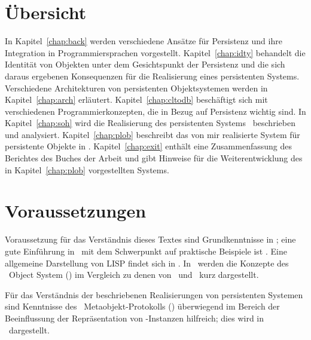 \section{\"{U}bersicht}
%
In Kapitel~\ref{chap:back} werden verschiedene Ans\"{a}tze f\"{u}r
Persistenz und ihre Integration in Programmiersprachen vorgestellt.
Kapitel~\ref{chap:idty} behandelt die Identit\"{a}t von Objekten unter
dem Gesichtspunkt der Persistenz und die sich daraus ergebenen
Konsequenzen f\"{u}r die Realisierung eines persistenten Systems.
Verschiedene Architekturen von persistenten Objektsystemen werden in
Kapitel~\ref{chap:arch} erl\"{a}utert.  Kapitel~\ref{chap:cltodb}
besch\"{a}ftigt sich mit verschiedenen Programmierkonzepten, die in
Bezug auf Persistenz wichtig sind.  \ifbericht\else In
Kapitel~\ref{chap:soh} wird die Realisierung des persistenten Systems
\soh\ beschrieben und analysiert. \fi Kapitel~\ref{chap:plob}
beschreibt das von mir realisierte System f\"{u}r persistente Objekte
in \cl. Kapitel~\ref{chap:exit} enth\"{a}lt eine Zusammenfassung
\ifbericht des Berichtes \else\ifbuch des Buches \else der Arbeit
\fi\fi und gibt Hinweise f\"{u}r die Weiterentwicklung des in
Kapitel~\ref{chap:plob} vorgestellten Systems.
%
\section{Voraussetzungen}
%
Voraussetzung f\"{u}r das Verst\"{a}ndnis dieses Textes sind Grundkenntnisse
in \cl; eine gute Einf\"{u}hrung in \cl\ mit dem Schwerpunkt auf
praktische Beispiele ist \cite{bib:no92}. Eine allgemeine Darstellung
von LISP findet sich in \cite{bib:wi89}. In
\ werden die Konzepte des \cl\ Object System
(\clos) im Vergleich zu denen von \smalltalk\ und \cpp\ kurz
dargestellt.
%
\par{}F\"{u}r das Verst\"{a}ndnis der beschriebenen Realisierungen von
persistenten Systemen sind Kenntnisse des \clos\ Metaobjekt-Protokolls
(\mop) \"{u}berwiegend im Bereich der Beeinflussung der
Repr\"{a}sentation von \clos-Instanzen hilfreich; dies wird in
\ dargestellt.
%
